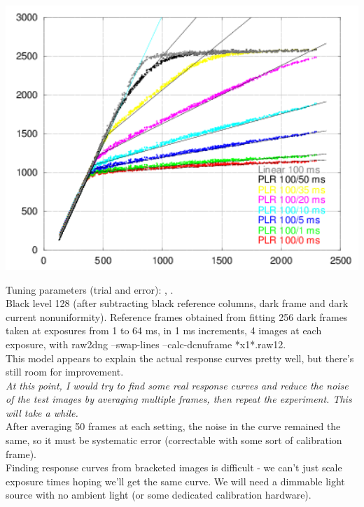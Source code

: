 \begin{center}
\includegraphics[height=10cm]{images/100-x-32-plr-vs-30ms-lin-model1}
\end{center}

Tuning parameters (trial and error): , .\\

Black level 128 (after subtracting black reference columns, dark frame and dark current nonuniformity). Reference frames obtained from fitting 256 dark frames taken at exposures from 1 to 64 ms, in 1 ms increments, 4 images at each exposure, with raw2dng --swap-lines --calc-dcnuframe *x1*.raw12.\\

This model appears to explain the actual response curves pretty well, but there's still room for improvement. \\

\textit{At this point, I would try to find some real response curves and reduce the noise of the test images by averaging multiple frames, then repeat the experiment. This will take a while.}\\

After averaging 50 frames at each setting, the noise in the curve remained the same, so it must be systematic error (correctable with some sort of calibration frame).\\

Finding response curves from bracketed images is difficult - we can't just scale exposure times hoping we'll get the same curve. We will need a dimmable light source with no ambient light (or some dedicated calibration hardware).\\


